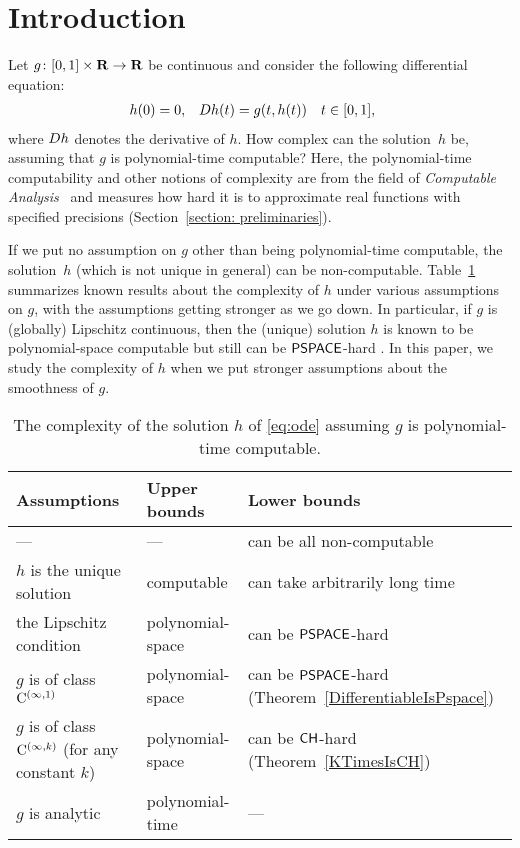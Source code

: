 \section{Introduction}

Let $g \colon [0,1] \times \mathbf R \to \mathbf R$ be continuous 
and consider the following differential equation: 
\begin{align}
 \label{eq:ode}
 h(0) & = 0, &
 D h(t) & = g(t,h(t)) \quad t \in [0,1], 
\end{align}
where $D h$ denotes the derivative of $h$. 
How complex can the solution~$h$ be, 
assuming that $g$ is polynomial-time computable? 
Here, the polynomial-time computability 
and other notions of complexity 
are from the field of 
\emph{Computable Analysis}~\cite{weihrauch00:_comput_analy}
and measures how hard it is to 
approximate real functions with specified precisions 
(Section~\ref{section: preliminaries}). 

If we put no assumption on $g$ other than being polynomial-time computable, 
the solution~$h$ (which is not unique in general) can be non-computable. 
Table~\ref{table:related} summarizes known results about 
the complexity of $h$ under various assumptions on $g$, 
with the assumptions getting stronger as we go down. 
In particular, if $g$ is (globally) Lipschitz continuous, 
then the (unique) solution $h$ is known to be 
polynomial-space computable but still can be 
$\mathsf{PSPACE}$-hard \cite{kawamura2010lipschitz}. 
In this paper, we study the complexity of $h$ 
when we put stronger assumptions about 
the smoothness of $g$. 

\begin{table}
\renewcommand\arraystretch{1.3}
\begin{center}
 \caption{The complexity of the solution $h$ of \eqref{eq:ode}
 assuming $g$ is polynomial-time computable.}
 \label{table:related}
 \begin{tabular}{lll}
  Assumptions & Upper bounds & Lower bounds \\
  \hline
   --- & --- & can be all non-computable \cite{pour1979computable} \\
  $h$ is the unique solution & computable \cite{coddington1955theory}
  & can take arbitrarily long time \cite{ko1983computational, miller1970recursive} \\
  the Lipschitz condition  & polynomial-space \cite{ko1983computational}
      &	can be $\mathsf{PSPACE}$-hard \cite{kawamura2010lipschitz}\\
  $g$ is of class $\mathrm C ^{(\infty, 1)}$ & polynomial-space 
      & \parbox[t]{14zw}{can be $\mathsf{PSPACE}$-hard\\{}(Theorem~\ref{DifferentiableIsPspace})} \\
  \parbox[t]{14zw}{$g$ is of class $\mathrm C ^{(\infty, k)}$\\{}(for any constant $k$)}
  & polynomial-space & \parbox[t]{14zw}{can be $\mathsf{CH}$-hard\\{}(Theorem~\ref{KTimesIsCH})} \\
  $g$ is analytic
  & polynomial-time \cite{muller1987uniform, ko1988computing} 
  & ---
 \end{tabular}
\end{center}
\end{table}

